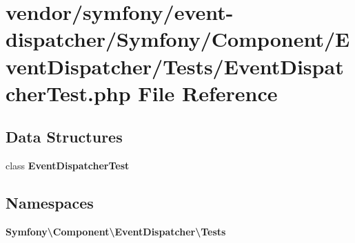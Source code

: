 \section{vendor/symfony/event-\/dispatcher/\+Symfony/\+Component/\+Event\+Dispatcher/\+Tests/\+Event\+Dispatcher\+Test.php File Reference}
\label{_event_dispatcher_test_8php}
\subsection*{Data Structures}
\begin{DoxyCompactItemize}
\item 
class {\bf Event\+Dispatcher\+Test}
\end{DoxyCompactItemize}
\subsection*{Namespaces}
\begin{DoxyCompactItemize}
\item 
 {\bf Symfony\textbackslash{}\+Component\textbackslash{}\+Event\+Dispatcher\textbackslash{}\+Tests}
\end{DoxyCompactItemize}
